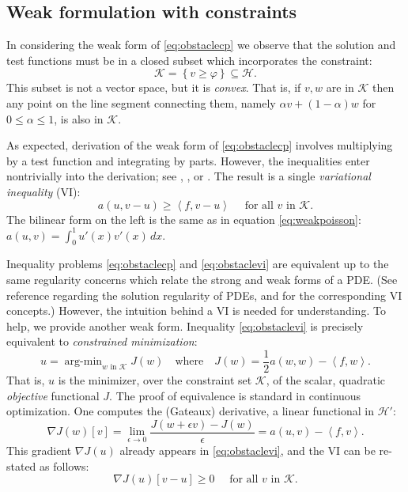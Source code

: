 \documentclass[letterpaper,final,12pt,reqno]{amsart}
\newcommand{\eps}{\epsilon}
\newcommand{\grad}{\nabla}
\newcommand{\ip}[2]{\left<#1,#2\right>}
\numberwithin{equation}{section}
\numberwithin{figure}{section}
\numberwithin{table}{section}
\begin{document}
\subsection*{Weak formulation with constraints}  In considering the weak form of \eqref{eq:obstaclecp} we observe that the solution and test functions must be in a closed subset which incorporates the constraint:
\begin{equation}
\mathcal{K} = \left\{v \ge \varphi\right\} \subseteq \mathcal{H}.  \label{eq:Kdefine}
\end{equation}
This subset is not a vector space, but it is \emph{convex}.  That is, if $v,w$ are in $\mathcal{K}$ then any point on the line segment connecting them, namely $\alpha v + (1-\alpha) w$ for $0 \le \alpha \le 1$, is also in $\mathcal{K}$.  

As expected, derivation of the weak form of \eqref{eq:obstaclecp} involves multiplying by a test function and integrating by parts.  However, the inequalities enter nontrivially into the derivation; see \cite[Chapter 12]{Bueler2021}, \cite{JouvetBueler2012}, or \cite{KinderlehrerStampacchia1980}.  The result is a single \emph{variational inequality} (VI):
\begin{equation}
  a(u,v-u) \ge \ip{f}{v-u} \quad \text{ for all } v \text{ in } \mathcal{K}. \label{eq:obstaclevi}
\end{equation}
The bilinear form on the left is the same as in equation \eqref{eq:weakpoisson}: $a(u,v) = \int_0^1 u'(x) v'(x)\,dx$.

Inequality problems \eqref{eq:obstaclecp} and \eqref{eq:obstaclevi} are equivalent up to the same regularity concerns which relate the strong and weak forms of a PDE.  (See reference \cite{Evans2010} regarding the solution regularity of PDEs, and \cite{KinderlehrerStampacchia1980} for the corresponding VI concepts.)  However, the intuition behind a VI is needed for understanding.  To help, we provide another weak form.  Inequality \eqref{eq:obstaclevi} is precisely equivalent to \emph{constrained minimization}:
\newcommand{\argmin}{\mathop{\mathrm{arg\text{-}min}}}
\begin{equation}
  u = \argmin_{w \text{ in } \mathcal{K}} J(w) \quad \text{where} \quad J(w) = \frac{1}{2} a(w,w) - \ip{f}{w}. \label{eq:obstaclemin}
\end{equation}
That is, $u$ is the minimizer, over the constraint set $\mathcal{K}$, of the scalar, quadratic \emph{objective} functional $J$.  The proof of equivalence is standard in continuous optimization.  One computes the (Gateaux) derivative, a linear functional in $\mathcal{H}'$:
\begin{equation}
  \grad J(w)[v] = \lim_{\eps\to 0} \frac{J(w+\eps v) - J(w)}{\eps} = a(u,v) - \ip{f}{v}.  \label{eq:gradobjective}
\end{equation}
This gradient $\nabla J(u)$ already appears in \eqref{eq:obstaclevi}, and the VI can be re-stated as follows:
\begin{equation}
  \nabla J(u)[v-u] \ge 0 \quad \text{ for all } v \text{ in } \mathcal{K}. \label{eq:obstaclevigradient}
\end{equation}
\end{document}
